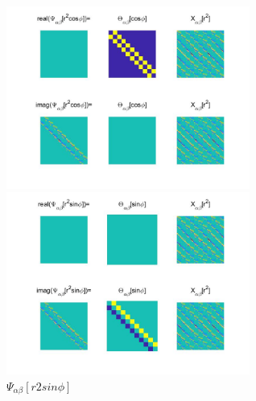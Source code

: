 \documentclass{Note}
\begin{document}
\begin{figure}[htbp]
\centering
\begin{minipage}[t]{0.48\textwidth}
\centering
\includegraphics[width=8cm]{Psi_alpha_beta[r2cos_phi].jpg}
\caption{$\Psi_{\alpha\beta}[r2cos_phi]$}
\end{minipage}
\begin{minipage}[t]{0.48\textwidth}
\centering
\includegraphics[width=8cm]{Psi_alpha_beta[r2sin_phi].jpg}
\caption{$\Psi_{\alpha\beta}[r2sin\phi]$}
\end{minipage}
\end{figure}
\end{document}
